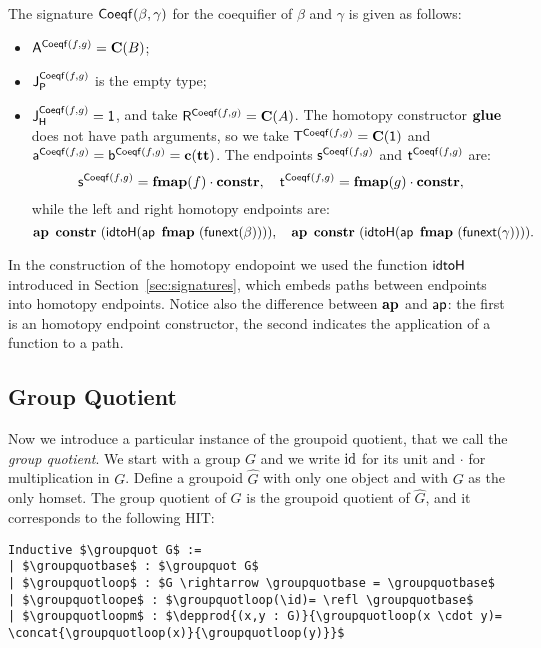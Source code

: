 The signature $\coequifier \beta \gamma$ for the coequifier of $\beta$
and $\gamma$ is given as follows:
\begin{itemize}
\item $\pointconstr[\coequifier f g] = \constantP{B}$;
\item $\pathlabel[\coequifier f g]$ is the empty type; 
\item $\homotlabel[\coequifier f g] = \unit$, and take 
  $\homotpointarg[\coequifier f g] = \constantP{A}$.
  The homotopy constructor $\coequifierglue$ does not have path arguments, so we take  
  $\homotpathtarg[\coequifier f g] = \constantP{\unit}$ and
  $\pathargleft[\coequifier f g] = \pathargright[\coequifier f g] = \Ce(\unitt)$.
  The endpoints $\homotpathleft[\coequifier f g]$ and $\homotpathright[\coequifier f g]$ are:
  \[
  \homotpathleft[\coequifier f g] = \comp{\fmap(f)}{\constr}, \quad
  \homotpathright[\coequifier f g] = \comp{\fmap(g)}{\constr},
  \]
  while the left and right homotopy endpoints are:
  \[
  \hap{\constr}{(\idtoH(\ap{\fmap}{(\funextsec(\beta))}))}, \quad
  \hap{\constr}{(\idtoH(\ap{\fmap}{(\funextsec(\gamma))}))}.
  \]
\end{itemize}
In the construction of the homotopy endopoint we used the function
$\idtoH$ introduced in Section~\ref{sec:signatures}, which embeds
paths between endpoints into homotopy endpoints. Notice also the
difference between $\constructor{ap}$ and $\constfont{ap}$: the first
is an homotopy endpoint constructor, the second indicates the
application of a function to a path.


\subsection{Group Quotient}
\label{sec:group_quotient}

Now we introduce a particular instance of the groupoid quotient, that
we call the \emph{group quotient}. We start with a group $G$ and we write $\id$ 
for its unit and $\cdot$ for multiplication in $G$. Define a groupoid $\widehat{G}$
with only one object and with $G$ as the only homset. The group
quotient of $G$ is the groupoid quotient of $\widehat{G}$, and it
corresponds to the following HIT:
\begin{lstlisting}[mathescape=true]
Inductive $\groupquot G$ :=
| $\groupquotbase$ : $\groupquot G$
| $\groupquotloop$ : $G \rightarrow \groupquotbase = \groupquotbase$
| $\groupquotloope$ : $\groupquotloop(\id)= \refl \groupquotbase$
| $\groupquotloopm$ : $\depprod{(x,y : G)}{\groupquotloop(x \cdot y)= \concat{\groupquotloop(x)}{\groupquotloop(y)}}$
\end{lstlisting}

